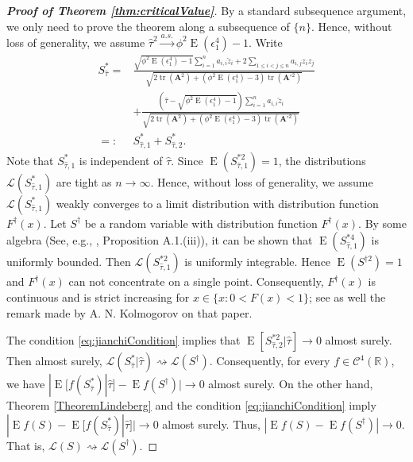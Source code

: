 \documentclass[smallextended]{svjour3}       %
\DeclareMathOperator{\mytr}{tr}
\DeclareMathOperator{\myE}{E}
\newcommand{\BA}{\mathbf{A}}    \newcommand{\BB}{\mathbf{B}}    \newcommand{\BC}{\mathbf{C}}    \newcommand{\BD}{\mathbf{D}}    \newcommand{\BE}{\mathbf{E}}    \newcommand{\BF}{\mathbf{F}}    \newcommand{\BG}{\mathbf{G}}    \newcommand{\BH}{\mathbf{H}}    \newcommand{\BI}{\mathbf{I}}    \newcommand{\BJ}{\mathbf{J}}    \newcommand{\BK}{\mathbf{K}}    \newcommand{\BL}{\mathbf{L}}
\begin{document}
\begin{proof}[\textbf{Proof of Theorem \ref{thm:criticalValue}}]
    By a standard subsequence argument, we only need to prove the theorem along a subsequence of $\{n\}$.
    Hence, without loss of generality, we assume $\hat \tau^2 \xrightarrow{a.s.} \phi^2 \myE (\epsilon_1^4)-1$.
    Write
    \begin{equation*}
        \begin{split}
        S_{\hat \tau}^*
        =&
        \frac{
            \sqrt{\phi^2\myE (\epsilon_1^4)-1} \sum_{i=1}^n  a_{i,i}\check z_i
        +2\sum_{1\leq i <j \leq n} a_{i,j} z_i z_j
    }
    {
            \sqrt{
    2 \mytr(\BA^2)
    +
    (\phi^2\myE (\epsilon_1^4)-3) \mytr(\BA^{\circ 2})
            }             
        }
        \\
        &+
        \frac{
                (\hat \tau -
            \sqrt{
                \phi^2\myE (\epsilon_1^4)-1
            }
        )
             \sum_{i=1}^n  a_{i,i}\check z_i
    }
    {
            \sqrt{
    2 \mytr(\BA^2)
    +
    (\phi^2\myE (\epsilon_1^4)-3) \mytr(\BA^{\circ 2})
            }             
        }
        \\
        =:& S_{\hat \tau,1}^{*} + S_{\hat \tau,2}^{*}
    .
        \end{split}
    \end{equation*}
    Note that $S_{\hat{\tau},1}^*$ is independent of $\hat \tau$.
    Since $\myE ( S_{\hat \tau,1}^{*2} )=1$,  the distributions $\mathcal L(S_{\hat \tau,1}^{*}) $ are tight as $n\to \infty$.
    Hence, without loss of generality, we assume $\mathcal L (S_{\hat \tau,1}^*)$ weakly converges to a limit distribution with distribution function $F^\dagger(x)$.
    Let $S^\dagger$ be a random variable with distribution function $F^\dagger(x)$.
    By some algebra (See, e.g., \cite{chen2010tests}, Proposition A.1.(iii)),
    it can be shown that $\myE (S^{*4}_{\hat \tau,1})$ is uniformly bounded.
    Then $\mathcal L ( S_{\hat \tau,1}^{*2} )$ is  uniformly integrable.
    Hence $\myE(S^{\dagger 2})=1$ and $F^\dagger(x)$ can not concentrate on a single point.
    Consequently, $F^\dagger(x)$ is continuous and is strict increasing for $x\in\{x:0<F(x)<1\}$; see \cite{Sevast1961A} as well the remark made by A. N. Kolmogorov on that paper.

    The condition \eqref{eq:jianchiCondition} implies that $\myE[S_{\hat \tau,2}^{*2}|\hat \tau]\to 0$ almost surely.
    Then almost surely, $\mathcal L (S^*_{\hat \tau}|\hat \tau) \rightsquigarrow \mathcal L(S^\dagger)$.
    Consequently, for every $f\in \mathscr C^4 (\mathbb R)$,
    we have $| \myE [f(S^*_{\hat \tau}) |\hat\tau] - \myE f(S^\dagger) |\to 0$ almost surely.
    On the other hand, Theorem \ref{TheoremLindeberg} and the condition \eqref{eq:jianchiCondition} imply
        $|\myE f(S)- \myE [f(S^*_{\hat \tau})|\hat\tau] |\to 0$ almost surely.
        Thus, $|\myE f(S)- \myE f(S^\dagger) |\to 0$.
        That is, $\mathcal L (S)\rightsquigarrow \mathcal L (S^\dagger)$.


\end{proof}
\end{document}
